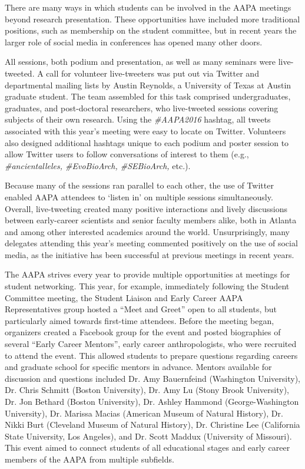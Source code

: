 \documentclass[english]{ijsra}
\begin{document}
There  are many ways in which students can be involved in the AAPA meetings beyond research presentation.  These opportunities have included more traditional positions, such as membership on the student committee, but in recent years the larger role of social media in conferences has opened many other doors.  

All sessions, both podium and presentation, as well as many seminars were live-tweeted.
A call for volunteer live-tweeters was put out via Twitter and departmental mailing lists by Austin Reynolds,
a University of Texas at Austin graduate student. 
The team assembled for this task comprised undergraduates, graduates, and post-doctoral researchers, 
who live-tweeted sessions covering subjects of their own research. 
Using the \emph{\#AAPA2016} hashtag, all tweets associated with this year’s meeting were easy to locate on Twitter. 
Volunteers also designed additional hashtags unique to each podium and poster session to allow Twitter users to
follow conversations of interest to them (e.g., \emph{\#ancientalleles, \#EvoBioArch, \#SEBioArch,} etc.).%

Because many of the sessions ran parallel to each other, the use of Twitter enabled AAPA attendees to ‘listen in’ on multiple sessions simultaneously. 
Overall, live-tweeting created many positive interactions and lively discussions between early-career scientists and senior faculty members alike, both in Atlanta and among other interested academics around the world.
Unsurprisingly, many delegates attending this year’s meeting commented positively on the use of social media, as the initiative has been successful at previous meetings in recent years.

The  AAPA strives every year to provide multiple opportunities at meetings for student networking.
This year, for example, immediately following the Student Committee meeting, 
the Student Liaison and Early Career AAPA Representatives group hosted a “Meet and Greet” open to all students,
but particularly aimed towards first-time attendees. 
Before the meeting began, organizers created a Facebook group for the event and posted biographies of several “Early Career Mentors”,
early career anthropologists, who were recruited to attend the event.
This allowed students to prepare questions regarding careers and graduate school for specific mentors in advance.  
Mentors available for discussion and questions included Dr. Amy Bauernfeind (Washington University),
Dr. Chris Schmitt (Boston University), Dr. Amy Lu (Stony Brook University), Dr. Jon Bethard (Boston University),
Dr. Ashley Hammond (George-Washington University), Dr. Marissa Macias (American Museum of Natural History),
Dr. Nikki Burt (Cleveland Museum of Natural History), Dr. Christine Lee (California State University, Los Angeles),
and Dr. Scott Maddux (University of Missouri).
This event aimed to connect students of all educational stages and early career members of the AAPA from multiple subfields.  
\end{document}
